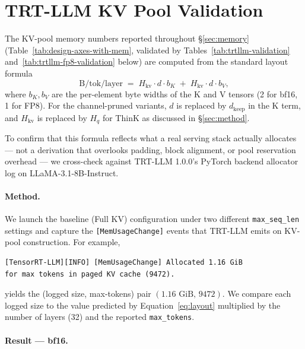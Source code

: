 \documentclass{article}
\begin{document}
 
 
\section{TRT-LLM KV Pool Validation}
\label{app:trtllm-validation}
 
The KV-pool memory numbers reported throughout \S\ref{sec:memory}
(Table~\ref{tab:design-axes-with-mem}, validated by Tables~\ref{tab:trtllm-validation}
and~\ref{tab:trtllm-fp8-validation} below) are computed from
the standard layout formula
\begin{equation}
\text{B/tok/layer} \;=\; H_{\mathrm{kv}} \cdot d \cdot b_K \;+\; H_{\mathrm{kv}} \cdot d \cdot b_V,
\label{eq:layout}
\end{equation}
where $b_K, b_V$ are the per-element byte widths of the K and V tensors
(2 for bf16, 1 for FP8). For the channel-pruned variants,
$d$ is replaced by $d_\text{keep}$ in the K term, and $H_{\mathrm{kv}}$
is replaced by $H_q$ for ThinK as discussed in
\S\ref{sec:method}.
 
To confirm that this formula reflects what a real serving stack
actually allocates --- not a derivation that overlooks padding,
block alignment, or pool reservation overhead --- we cross-check
against TRT-LLM 1.0.0's PyTorch backend allocator log on
LLaMA-3.1-8B-Instruct.
 
\paragraph{Method.} We launch the baseline (Full KV) configuration
under two different \texttt{max\_seq\_len} settings and capture the
\texttt{[MemUsageChange]} events that TRT-LLM emits on KV-pool
construction. For example,
\begin{verbatim}
[TensorRT-LLM][INFO] [MemUsageChange] Allocated 1.16 GiB
for max tokens in paged KV cache (9472).
\end{verbatim}
yields the (logged size, max-tokens) pair $(1.16\text{ GiB},\, 9472)$.
We compare each logged size to the value predicted by
Equation~\ref{eq:layout} multiplied by the number of layers (32) and
the reported \texttt{max\_tokens}.
 
\paragraph{Result --- bf16.}
 
\end{document}
